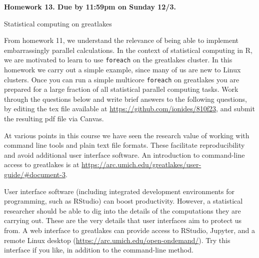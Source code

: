 \documentclass[12pt]{article}
\begin{document}
\begin{center}\bf
Homework 13. Due by 11:59pm on Sunday 12/3.

Statistical computing on greatlakes

\end{center}

From homework 11, we understand the relevance of being able to implement embarrassingly parallel calculations. In the context of statistical computing in R, we are motivated to learn to use \texttt{foreach} on the greatlakes cluster. In this homework we carry out a simple example, since many of us are new to Linux clusters. Once you can run a simple multicore \texttt{foreach} on greatlakes you are prepared for a large fraction of all statistical parallel computing tasks. Work through the questions below and write brief answers to the following questions, by editing the tex file available at \url{https://github.com/ionides/810f23}, and submit the resulting pdf file via Canvas. 

At various points in this course we have seen the research value of working with command line tools and plain text file formats. These facilitate reproducibility and avoid additional user interface software. An introduction to command-line access to greatlakes is at \url{https://arc.umich.edu/greatlakes/user-guide/#document-3}.

User interface software (including integrated development environments for programming, such as RStudio) can boost productivity. However, a statistical researcher should be able to dig into the details of the computations they are carrying out. These are the very details that user interfaces aim to protect us from. A web interface to greatlakes can provide access to RStudio, Jupyter, and a remote Linux desktop (\url{https://arc.umich.edu/open-ondemand/}). Try this interface if you like, in addition to the command-line method.
\end{document}
